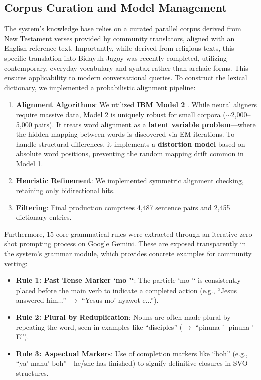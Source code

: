 \documentclass[12pt]{article}
\begin{document}
\subsection{Corpus Curation and Model Management}
The system's knowledge base relies on a curated parallel corpus derived from New Testament verses provided by community translators, aligned with an English reference text. Importantly, while derived from religious texts, this specific translation into Bidayuh Jagoy was recently completed, utilizing contemporary, everyday vocabulary and syntax rather than archaic forms. This ensures applicability to modern conversational queries. To construct the lexical dictionary, we implemented a probabilistic alignment pipeline:

\begin{enumerate}
    \item \textbf{Alignment Algorithms}: We utilized \textbf{IBM Model 2} \cite{brown1993mathematics}. While neural aligners require massive data, Model 2 is uniquely robust for small corpora ($\sim$2,000--5,000 pairs). It treats word alignment as a \textbf{latent variable problem}---where the hidden mapping between words is discovered via EM iterations. To handle structural differences, it implements a \textbf{distortion model} based on absolute word positions, preventing the random mapping drift common in Model 1. 
    \item \textbf{Heuristic Refinement}: We implemented symmetric alignment checking, retaining only bidirectional hits.
    \item \textbf{Filtering}: Final production comprises 4,487 sentence pairs and 2,455 dictionary entries.
\end{enumerate}

Furthermore, 15 core grammatical rules were extracted through an iterative zero-shot prompting process on Google Gemini. These are exposed transparently in the system's grammar module, which provides concrete examples for community vetting:
\begin{itemize}
    \item \textbf{Rule 1: Past Tense Marker `mo '`}: The particle `mo '` is consistently placed before the main verb to indicate a completed action (e.g., ``Jesus answered him...'' $\rightarrow$ ``Yesus mo' nyawot-e...'').
    \item \textbf{Rule 2: Plural by Reduplication}: Nouns are often made plural by repeating the word, seen in examples like ``disciples'' ($\rightarrow$ ``pinuna ' -pinuna '-E'').
    \item \textbf{Rule 3: Aspectual Markers}: Use of completion markers like ``boh'' (e.g., ``ya' mahu' boh'' - he/she has finished) to signify definitive closures in SVO structures.
\end{itemize}
\end{document}

